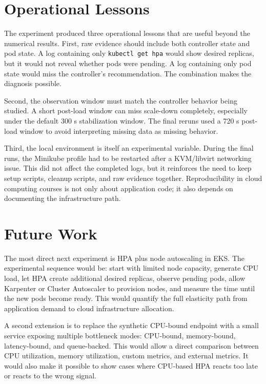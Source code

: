 \documentclass[conference]{IEEEtran}
\begin{document}
\section{Operational Lessons}

The experiment produced three operational lessons that are useful beyond the numerical results. First, raw evidence should include both controller state and pod state. A log containing only \texttt{kubectl get hpa} would show desired replicas, but it would not reveal whether pods were pending. A log containing only pod state would miss the controller's recommendation. The combination makes the diagnosis possible.

Second, the observation window must match the controller behavior being studied. A short post-load window can miss scale-down completely, especially under the default 300 s stabilization window. The final reruns used a 720 s post-load window to avoid interpreting missing data as missing behavior.

Third, the local environment is itself an experimental variable. During the final runs, the Minikube profile had to be restarted after a KVM/libvirt networking issue. This did not affect the completed logs, but it reinforces the need to keep setup scripts, cleanup scripts, and raw evidence together. Reproducibility in cloud computing courses is not only about application code; it also depends on documenting the infrastructure path.

\section{Future Work}

The most direct next experiment is HPA plus node autoscaling in EKS. The experimental sequence would be: start with limited node capacity, generate CPU load, let HPA create additional desired replicas, observe pending pods, allow Karpenter or Cluster Autoscaler to provision nodes, and measure the time until the new pods become ready. This would quantify the full elasticity path from application demand to cloud infrastructure allocation.

A second extension is to replace the synthetic CPU-bound endpoint with a small service exposing multiple bottleneck modes: CPU-bound, memory-bound, latency-bound, and queue-backed. This would allow a direct comparison between CPU utilization, memory utilization, custom metrics, and external metrics. It would also make it possible to show cases where CPU-based HPA reacts too late or reacts to the wrong signal.
\end{document}
